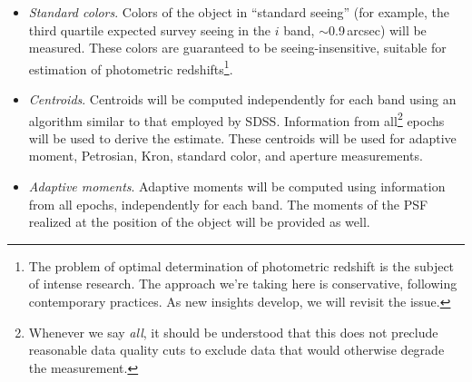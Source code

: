 \documentclass[SE,lsstdraft,toc]{lsstdoc}
\begin{document}
\begin{itemize}
In addition to the maximum likelihood values of fitted parameters and their covariance matrix, a number (currently planned to be $\sim$200, on average\footnote{This choice of the number of independent samples will be verified during Construction.}) of independent samples from the likelihood function will be provided. These will enable use-cases sensitive to departures from the Gaussian approximation, with shear measurement being the primary use case. A permissible descope, in case of insufficient storage, will be not to sample the posterior for $u$ and $y$ bands.

    \item \emph{Standard colors}.  Colors of the object in ``standard seeing'' (for example, the third quartile expected survey seeing in the $i$ band, $\sim$0.9\,arcsec) will be measured. These colors are guaranteed to be seeing-insensitive,  suitable for estimation of photometric redshifts\footnote{The problem of optimal determination of photometric redshift is the subject of intense research. The approach we're taking here is conservative, following contemporary practices. As new insights develop, we will revisit the issue.}.

    \item \emph{Centroids}. Centroids will be computed independently for each band using an algorithm similar to that employed by SDSS. Information from all\footnote{Whenever we say \emph{all}, it should be understood that this does not preclude reasonable data quality cuts to exclude data that would otherwise degrade the measurement.} epochs will be used to derive the estimate. These centroids will be used for adaptive moment, Petrosian, Kron, standard color, and aperture measurements. 

    \item \emph{Adaptive moments}. Adaptive moments will be computed using information from all epochs, independently for each band. The moments of the PSF realized at the position of the object will be provided as well. 


\end{itemize}
\end{document}
